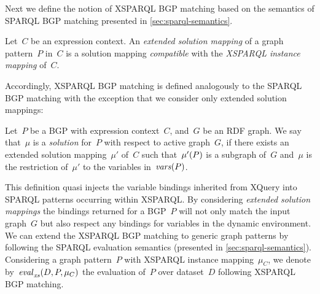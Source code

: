 %
Next we define the notion of XSPARQL \ac{BGP} matching based on the semantics of SPARQL \ac{BGP} matching presented in
\cref{sec:sparql-semantics}.
%
\begin{definition}\label{def:extended-solution-mapping}
  Let~$C$ be an expression context. An \emph{extended solution mapping} of a graph pattern~$P$ in~$C$ is a solution
  mapping \emph{compatible} with the \emph{XSPARQL instance mapping} of~$C$.
\end{definition}
% 
\noindent Accordingly, XSPARQL \ac{BGP} matching is defined analogously to the SPARQL \ac{BGP} matching with the
exception that we consider only extended solution mappings:
%
\begin{definition}\label{def:xsparql-bgp-matching}
  Let~$P$ be a \ac{BGP} with expression context~$C$, and~$G$ be an \ac{RDF} graph. We say that~$\mu$ is a
  \emph{solution} for~$P$ with respect to active graph~$G$, if there exists an extended solution mapping~$\mu'$ of~$C$
  such that~$\mathit{\mu'}\!\left(P\right)$ is a subgraph of~$G$ and~$\mu$ is the restriction of~$\mu'$ to the variables
  in~$\mathit{vars}\!\left(P\right)$.
\end{definition}
%
\noindent This definition quasi injects the variable bindings inherited from XQuery into SPARQL patterns occurring
within XSPARQL.  By considering \emph{extended solution mappings} the bindings returned for a \ac{BGP}~$P$ will not only
match the input graph~$G$ but also respect any bindings for variables in the dynamic environment.
%
We can extend the XSPARQL \ac{BGP} matching to generic graph patterns by following the SPARQL evaluation semantics
(presented in \cref{sec:sparql-semantics}).
%
Considering a graph pattern~$P$ with XSPARQL instance mapping~$\mu_C$, we denote by~$\mathit{{\mathit{eval}}_{\mathit{xs}}^{\mathit{}}}\!\left(D, P, \mu_C\right)$ the
evaluation of~$P$ over dataset~$D$ following XSPARQL \ac{BGP} matching.
 
